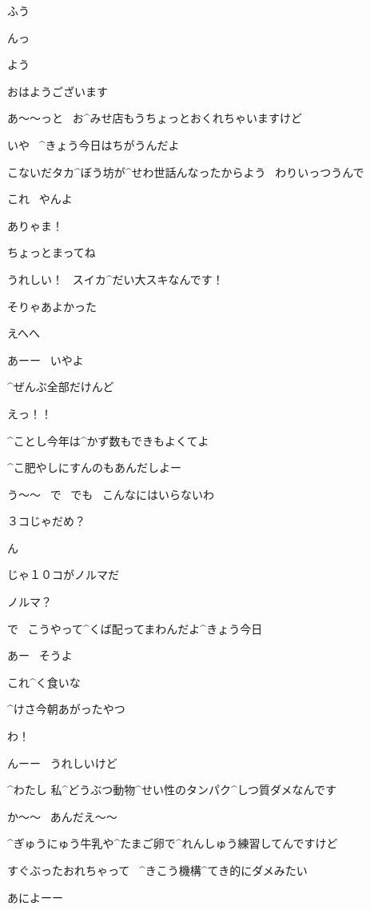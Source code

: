 \Alpha ふう

\page[67]
\Alpha んっ

\Ojisan よう

\Alpha おはようございます

\page[68]
\Alpha あ〜〜っと
\ お^{みせ}{店}もうちょっとおくれちゃいますけど

\Ojisan いや
\ ^{きょう}{今日}はちがうんだよ

\Ojisan こないだタカ^{ぼう}{坊}が^{せわ}{世話}んなったからよう
\ わりいっつうんで

\Ojisan これ
\ やんよ

\Alpha ありゃま！

\Alpha ちょっとまってね

\Alpha うれしい！
\ スイカ^{だい}{大}スキなんです！

\Ojisan そりゃあよかった

\page[69]
\Alpha えへへ

\Ojisan あーー
\ いやよ

\Ojisan ^{ぜんぶ}{全部}だけんど

\Alpha えっ！！

\Ojisan ^{ことし}{今年}は^{かず}{数}もできもよくてよ

\Ojisan ^{こ}{肥}やしにすんのもあんだしよー

\Alpha う〜〜
\ で
\ でも
\ こんなにはいらないわ

\Alpha ３コじゃだめ？

\page[70]
\Ojisan ん

\Ojisan じゃ１０コがノルマだ

\Alpha ノルマ？

\Ojisan で
\ こうやって^{くば}{配}ってまわんだよ^{きょう}{今日}

\Ojisan あー
\ そうよ

\page[71]
\Ojisan これ^{く}{食}いな

\Ojisan ^{けさ}{今朝}あがったやつ

\Alpha わ！

\Alpha んーー
\ うれしいけど

\Alpha ^{わたし }{私}^{どうぶつ}{動物}^{せい}{性}のタンパク^{しつ}{質}ダメなんです

\Ojisan か〜〜
\ あんだえ〜〜

\Alpha ^{ぎゅうにゅう}{牛乳}や^{たまご}{卵}で^{れんしゅう}{練習}してんですけど

\Alpha すぐぶったおれちゃって
\ ^{きこう}{機構}^{てき}{的}にダメみたい

\page[72]
\Ojisan あによーー

